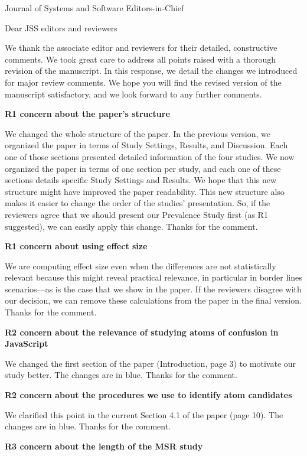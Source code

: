 \documentclass{letter}
\begin{document}
\begin{letter}{Journal of Systems and Software Editors-in-Chief}
  
  \opening{Dear JSS editors and reviewers}

  We thank the associate editor and reviewers
  for their detailed, constructive comments. We took great care to address all points raised
  with a thorough revision of the manuscript. In this response, we detail the changes we introduced for major
  review comments. We hope you will find the revised version of the manuscript satisfactory,
  and we look forward to any further comments.


{\bf R1 concern about the paper's structure}

We changed the whole structure of the paper. In the previous version,
we organized the paper in terms of Study Settings, Results, and Discussion.
Each one of those sections presented detailed information of the four studies.
We now organized the paper in terms of one section per study, and each
one of these sections details specific Study Settings and Results. We
hope that this new structure might have improved the paper readability.
This new structure also makes it easier to change the order of the
studies' presentation. So, if the reviewers agree that we should
present our Prevalence Study first (as R1 suggested), we can easily
apply this change. Thanks for the comment. 

{\bf R1 concern about using effect size}

We are computing effect size even when the differences are
not statistically relevant because this might reveal practical
relevance, in particular in border lines scenarios---as is the case
that we show in the paper. If the reviewers disagree with our
decision, we can remove these calculations from the paper in the
final version. Thanks for the comment. 

{\bf R2 concern about the relevance of studying atoms of confusion in JavaScript}

We changed the first section of the paper (Introduction, page 3) to motivate our study better. The
changes are in {\color{blue}blue}. Thanks for the comment. 

{\bf R2 concern about the procedures we use to identify atom candidates}

We clarified this point in the current Section 4.1 of the paper (page 10). The changes are in
{\color{blue}blue}. Thanks for the comment.


{\bf R3 concern about the length of the MSR study}


\end{letter}
\end{document}
